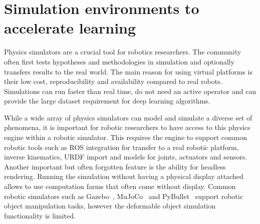 \documentclass[\home/main.tex]{subfiles}
\begin{document}
\section{Simulation environments to accelerate learning} \label{sec:lit_simulation}
Physics simulators are a crucial tool for robotics researchers. The community often first tests hypotheses and methodologies in simulation and optionally transfers results to the real world. The main reason for using virtual platforms is their low cost, reproducibility and availability compared to real robots. Simulations can run faster than real time, do not need an active operator and can provide the large dataset requirement for deep learning algorithms. 

While a wide array of physics simulators can model and simulate a diverse set of phenomena, it is important for robotic researchers to have access to this physics engine within a robotic simulator. This requires the engine to support common robotic tools such as ROS integration for transfer to a real robotic platform, inverse kinematics, URDF import and models for joints, actuators and sensors. Another important but often forgotten feature is the ability for headless rendering. Running the simulation without having a physical display attached allows to use computation farms that often come without display. Common robotic simulators such as Gazebo~\autocite{gazebo}, MuJoCo~\autocite{mujoco} and PyBullet~\autocite{pybullet} support robotic object manipulation tasks, however the deformable object simulation functionality is limited. 
\end{document}
